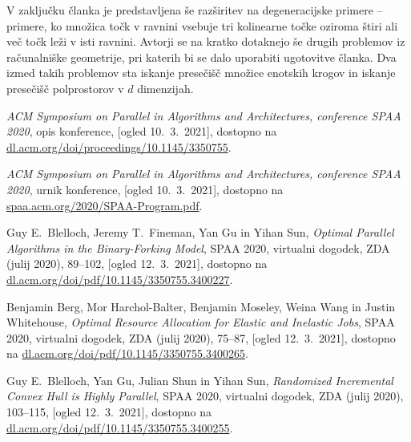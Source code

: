 \documentclass[a4paper,11pt]{article}
\begin{document}
V zaključku članka je predstavljena še razširitev na degeneracijske primere -- primere, ko množica točk v ravnini vsebuje tri kolinearne točke oziroma štiri ali več točk leži v isti ravnini. 
Avtorji se na kratko dotaknejo še drugih problemov iz računalniške geometrije, pri katerih bi se dalo uporabiti ugotovitve članka. 
Dva izmed takih problemov sta iskanje presečišč množice enotskih krogov in iskanje presečišč polprostorov v $d$ dimenzijah.



\begin{thebibliography}{99}

    \emph{ACM Symposium on Parallel in Algorithms and Architectures, conference SPAA 2020}, opis konference, [ogled 10.~3.~2021], dostopno na \url{dl.acm.org/doi/proceedings/10.1145/3350755}.
    
    \emph{ACM Symposium on Parallel in Algorithms and Architectures, conference SPAA 2020}, urnik konference, [ogled 10.~3.~2021], dostopno na \url{spaa.acm.org/2020/SPAA-Program.pdf}.

    Guy E.~Blelloch, Jeremy T.~Fineman, Yan Gu in Yihan Sun,
    \emph{Optimal Parallel Algorithms in the Binary-Forking Model}, SPAA 2020, virtualni dogodek, ZDA (julij 2020), 89--102, [ogled 12.~3.~2021], dostopno na \url{dl.acm.org/doi/pdf/10.1145/3350755.3400227}.

    Benjamin Berg, Mor Harchol-Balter, Benjamin Moseley, Weina Wang in Justin Whitehouse,
    \emph{Optimal Resource Allocation for Elastic and Inelastic Jobs}, SPAA 2020, virtualni dogodek, ZDA (julij 2020), 75--87, [ogled 12.~3.~2021], dostopno na \url{dl.acm.org/doi/pdf/10.1145/3350755.3400265}.

    Guy E.~Blelloch, Yan Gu, Julian Shun in Yihan Sun,
    \emph{Randomized Incremental Convex Hull is Highly Parallel}, SPAA 2020, virtualni dogodek, ZDA (julij 2020), 103--115, [ogled 12.~3.~2021], dostopno na \url{dl.acm.org/doi/pdf/10.1145/3350755.3400255}.
    
\end{thebibliography}
\end{document}
